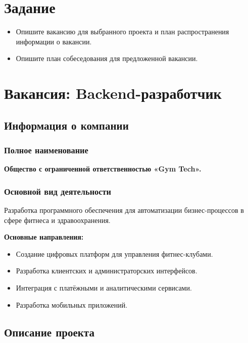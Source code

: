 \documentclass[14pt, russian]{matmex-diploma-custom}
\begin{document}

\maketitle

\section*{Задание}
\begin{itemize}
    \item Опишите вакансию для выбранного проекта и план распространения информации о вакансии.
    \item Опишите план собеседования для предложенной вакансии.
\end{itemize}

\section{Вакансия: Backend-разработчик}

\subsection*{Информация о компании}

\subsubsection*{Полное наименование}
\textbf{Общество с ограниченной ответственностью «Gym Tech».}

\subsubsection*{Основной вид деятельности}
Разработка программного обеспечения для автоматизации бизнес-процессов в сфере фитнеса и здравоохранения.

\textbf{Основные направления:}
\begin{itemize}[leftmargin=1.5em]
    \item Создание цифровых платформ для управления фитнес-клубами.
    \item Разработка клиентских и администраторских интерфейсов.
    \item Интеграция с платёжными и аналитическими сервисами.
    \item Разработка мобильных приложений.
\end{itemize}

\subsection*{Описание проекта}
\end{document}
